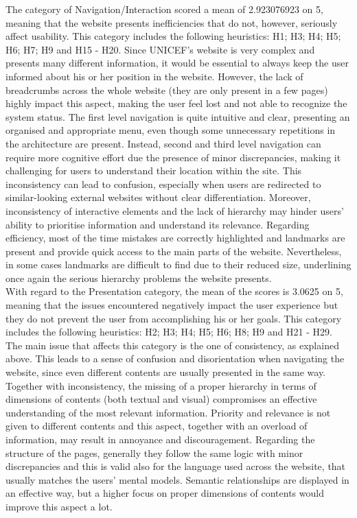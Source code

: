The category of Navigation/Interaction scored a mean of 2.923076923 on 5, meaning that the website presents inefficiencies that do not, however, seriously affect usability. This category includes the following heuristics: H1; H3; H4; H5; H6; H7; H9 and H15 - H20.
Since UNICEF’s website is very complex and presents many different information, it would be essential to always keep the user informed about his or her position in the website. However, the lack of breadcrumbs across the whole website (they are only present in a few pages) highly impact this aspect, making the user feel lost and not able to recognize the system status. 
The first level navigation is quite intuitive and clear, presenting an organised and appropriate menu, even though some unnecessary repetitions in the architecture are present. Instead, second and third level navigation can require more cognitive effort due the presence of minor discrepancies, making it challenging for users to understand their location within the site. This inconsistency can lead to confusion, especially when users are redirected to similar-looking external websites without clear differentiation. Moreover, inconsistency of interactive elements and the lack of hierarchy may hinder users' ability to prioritise information and understand its relevance.
Regarding efficiency, most of the time mistakes are correctly highlighted and landmarks are present and provide quick access to the main parts of the website. Nevertheless, in some cases landmarks are difficult to find due to their reduced size, underlining once again the serious hierarchy problems the website presents.\\

With regard to the Presentation category, the mean of the scores is 3.0625 on 5, meaning that the issues encountered negatively impact the user experience but they do not prevent the user from accomplishing his or her goals. This category includes the following heuristics: H2; H3; H4; H5; H6; H8; H9 and H21 - H29.
The main issue that affects this category is the one of consistency, as explained above. This leads to a sense of confusion and disorientation when navigating the website, since even different contents are usually presented in the same way. Together with inconsistency, the missing of a proper hierarchy in terms of dimensions of contents (both textual and visual) compromises an effective understanding of the most relevant information. Priority and relevance is not given to different contents and this aspect, together with an overload of information, may result in annoyance and discouragement.
Regarding the structure of the pages, generally they follow the same logic with minor discrepancies and this is valid also for the language used across the website, that usually matches the users’ mental models. Semantic relationships are displayed in an effective way, but a higher focus on proper dimensions of contents would improve this aspect a lot.\\

